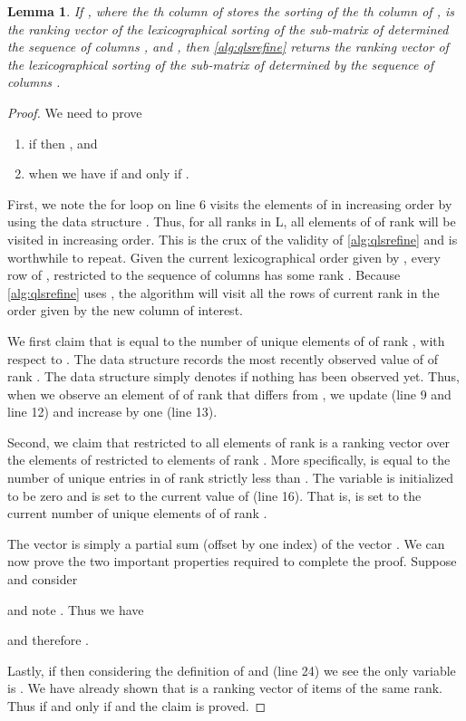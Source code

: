 \documentclass[a4paper,10pt,reqno]{amsart}
\newtheorem{lemma}{Lemma}
\theoremstyle{definition}
\begin{document}
\begin{lemma} 
\label{lem:qlsrefine}
If ,  where the th column of
 stores the sorting of the th column of
,  is the ranking vector of the lexicographical sorting of the
sub-matrix of  determined the sequence of columns
, and , then 
\autoref{alg:qlsrefine} returns the ranking vector  of the lexicographical
sorting of the sub-matrix of  determined by the sequence of columns
.
\end{lemma}
\begin{proof}
We need to prove 
\begin{enumerate}
    \item if  then , and
    \item when  we have  if and only if .
\end{enumerate}
First, we note the for
loop on line 6 visits the elements of  in increasing order by using the
data structure . Thus, for all ranks  in L, all elements of  of rank
 will be visited in increasing order. This is the crux of the validity of
\autoref{alg:qlsrefine} and is worthwhile to repeat. Given the current
lexicographical order given by , every row of , restricted to the
sequence of columns  has some rank . Because \autoref{alg:qlsrefine}
uses , the algorithm will visit all the rows of current rank  
in the order given by the new column  of interest.

We first claim that  is equal to the number of unique elements
of  of rank , with respect to . The data structure  records
the most recently observed value of  of rank . The data structure
 simply denotes if nothing has been observed yet. Thus, when
we observe an element of  of rank  that differs from ,
we update  (line 9 and line 12) and increase  by
one (line 13).

Second, we claim that  restricted to all elements of rank 
is a ranking vector over the elements of  restricted to elements of rank .
More specifically,  is equal to the number of unique entries in 
of rank  strictly less than . The variable  is initialized 
to be zero and is set to the current value of  (line 16). That is,
 is set to the current number of unique elements of  of
rank .

The vector  is simply a partial sum (offset by one index) of the vector
. We can now prove the two important properties required to complete
the proof.  Suppose  and consider



and note .
Thus we have 

and therefore .

Lastly, if  then considering the definition of  and 
(line 24) we see the only variable is . We have already shown
that  is a ranking vector of items of the same rank. Thus 
if and only if  and the claim is proved.
\end{proof}
\end{document}
